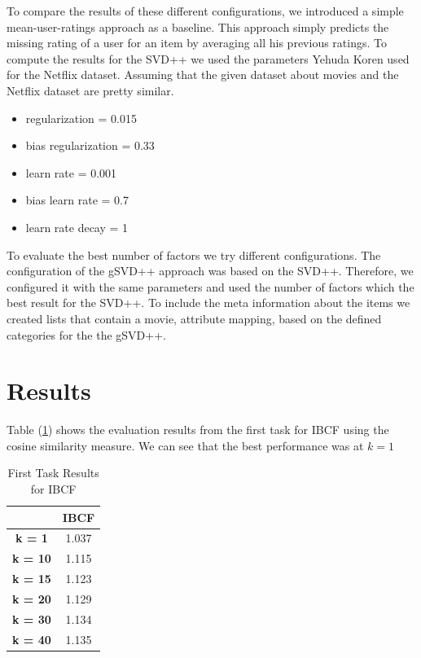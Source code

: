 \documentclass{sigish}
\begin{document}
To compare the results of these different configurations, we introduced a simple mean-user-ratings approach as a baseline. This approach simply predicts the missing rating of a user for an item by averaging all his previous ratings.
\newline
\newline
To compute the results for the SVD++ we used the parameters Yehuda Koren used for the Netflix dataset. Assuming that the given dataset about movies and the Netflix dataset are pretty similar.
\begin{itemize}
\item regularization = 0.015
\item bias regularization = 0.33
\item learn rate = 0.001
\item bias learn rate = 0.7
\item learn rate decay = 1
\end{itemize}
To evaluate the best number of factors we try different configurations.
\newline
\newline
The configuration of the gSVD++ approach was based on the SVD++. Therefore, we configured it with the same parameters and used the number of factors which the best result for the SVD++.
\newline
To include the meta information about the items we created lists that contain a movie, attribute mapping, based on the defined categories for the the gSVD++.

\section{Results}

Table (\ref{tab:eval_00}) shows the evaluation results from the first task for IBCF using the cosine similarity measure. We can see that the best performance was at $ k = 1 $

\begin{table}[]
\centering
\begin{tabular}{|c|c|}
\hline
                & \textbf{IBCF} \\ \hline
\textbf{k = 1}  & 1.037         \\ \hline
\textbf{k = 10} & 1.115         \\ \hline
\textbf{k = 15} & 1.123         \\ \hline
\textbf{k = 20} & 1.129         \\ \hline
\textbf{k = 30} & 1.134         \\ \hline
\textbf{k = 40} & 1.135         \\ \hline
\end{tabular}
\caption{First Task Results for IBCF}
\label{tab:eval_00}
\end{table}
\end{document}

